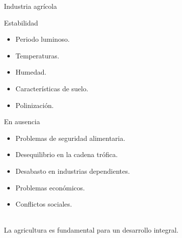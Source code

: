\documentclass[aspectratio=169]{beamer}
\begin{document}
\begin{frame}{Industria agrícola}
	\vspace{-1cm}
	\begin{minipage}{0.5\textwidth}
		\begin{block}{Estabilidad}
			\begin{itemize}
				\item Periodo luminoso.
				\item Temperaturas.
				\item Humedad.
				\item Características de suelo.
				\item Polinización.
				
			\end{itemize}
		\end{block}
	\end{minipage}%
	\begin{minipage}{0.5\textwidth}
		\pause\begin{block}{En ausencia}
			\begin{itemize}
				\item Problemas de seguridad alimentaria.
				\item Desequilibrio en la cadena trófica.
				\pause
				\item Desabasto en industrias dependientes.
				\item Problemas económicos.
				\item Conflictos sociales.
			\end{itemize}
		\end{block}
	\end{minipage}
	\pause
	\centering
	\,\\ \Large
	La agricultura es fundamental para un desarrollo integral.
\end{frame}
\end{document}
